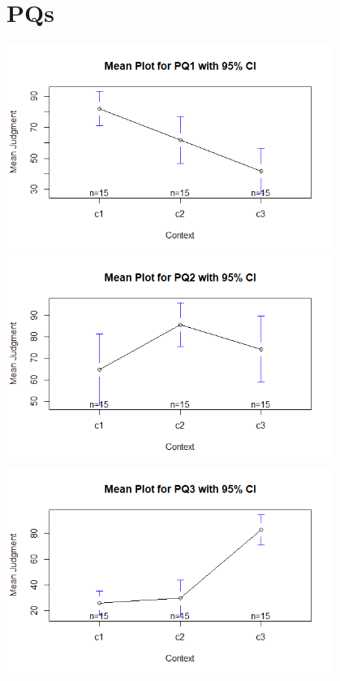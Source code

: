 \index{}\documentclass[a4paper, 11pt, fleqn, leqno ]{article}
\begin{document}
\section{PQs}\vspace{-2ex}
\includegraphics[width=0.8\textwidth]{means_PQ1.png}\\
\includegraphics[width=0.8\textwidth]{means_PQ2.png}\\
\includegraphics[width=0.8\textwidth]{means_PQ3.png}
\end{document}
